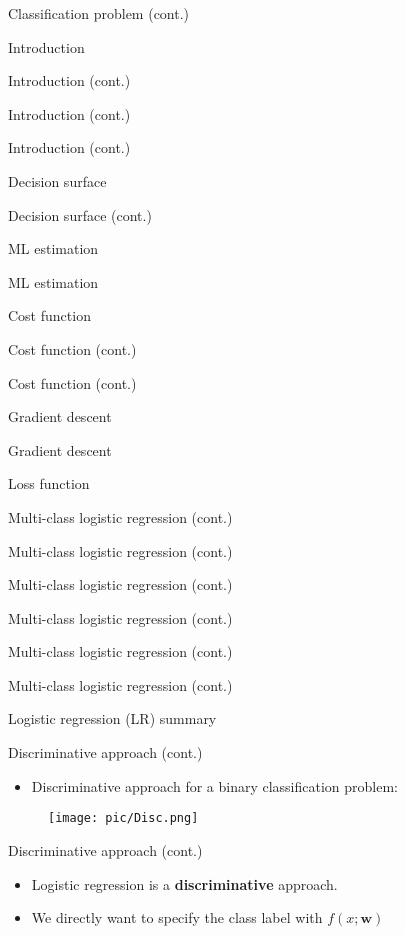 \documentclass[serif, aspectratio=169]{beamer}
\begin{document}
\begin{frame}{Classification problem (cont.)}
\begin{itemize}
\begin{frame}{Introduction}
\begin{itemize}
\begin{frame}{Introduction (cont.)}
\begin{frame}{Introduction (cont.)}
\begin{frame}{Introduction (cont.)}
\begin{frame}{Decision surface}
\begin{itemize}
\begin{frame}{Decision surface (cont.)}
\begin{frame}{ML estimation}
\begin{frame}{ML estimation}
\begin{itemize}
\begin{frame}{Cost function}
\begin{frame}{Cost function (cont.)}
\begin{itemize}
\begin{itemize}
\begin{frame}{Cost function (cont.)}
\begin{frame}{Gradient descent}
\begin{frame}{Gradient descent}
\begin{frame}{Loss function}
\begin{frame}{Multi-class logistic regression (cont.)}
\begin{frame}{Multi-class logistic regression (cont.)}
\begin{frame}{Multi-class logistic regression (cont.)}
\begin{frame}{Multi-class logistic regression (cont.)}
\begin{frame}{Multi-class logistic regression (cont.)}
\begin{frame}{Multi-class logistic regression (cont.)}
\begin{frame}{Logistic regression (LR) summary}
\begin{itemize}
\begin{frame}{Discriminative approach (cont.)}
    \begin{itemize}
        \item Discriminative approach for a binary classification problem:
    \end{itemize}
    \begin{figure}[h]
      \centering
      \texttt{[image: pic/Disc.png]}
      \end{figure}
    \vfill
\end{frame}
\begin{frame}{Discriminative approach (cont.)}
    \begin{itemize}
        \item Logistic regression is a \textbf{discriminative} approach.
        \item We directly want to specify the class label with $f(x;\mathbf{w})$
    \end{itemize}
\end{frame}


\end{itemize}
\end{frame}
\end{frame}
\end{frame}
\end{frame}
\end{frame}
\end{frame}
\end{frame}
\end{frame}
\end{frame}
\end{frame}
\end{frame}
\end{itemize}
\end{itemize}
\end{frame}
\end{frame}
\end{itemize}
\end{frame}
\end{frame}
\end{frame}
\end{itemize}
\end{frame}
\end{frame}
\end{frame}
\end{frame}
\end{itemize}
\end{frame}
\end{itemize}
\end{frame}
\end{document}
